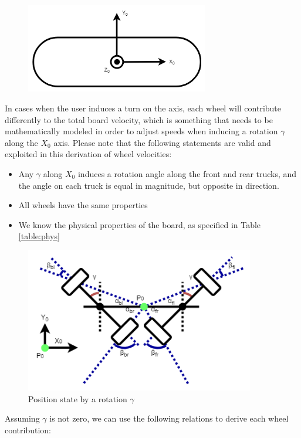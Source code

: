 \documentclass[titlepage, letterpaper,12pt]{article}
\begin{document}
\begin{figure}[h]
\includegraphics[width=8cm]{figs/Board_Axis.png}
\centering
\end{figure}

In cases when the user induces a turn on the axis, each wheel will contribute differently to the total board velocity, which is something that needs to be mathematically modeled in order to adjust speeds when inducing a rotation $\gamma$ along the $X _{0}$ axis. Please note that the following statements are valid and exploited in this derivation of wheel velocities:
\begin{itemize}
    \item Any $\gamma$ along $X _{0}$ induces a rotation angle along the front and rear trucks, and the angle on each truck is equal in magnitude, but opposite in direction.
    \item All wheels have the same properties
    \item We know the physical properties of the board, as specified in Table \ref{table:phys}
\end{itemize}

\begin{figure}[!h]
\caption{Position state by a rotation $\gamma$}
\includegraphics[width=10cm]{figs/Wheel_Reps.png}
\centering
\end{figure}

Assuming $\gamma$ is not zero, we can use the following relations to derive each wheel contribution:
\end{document}
